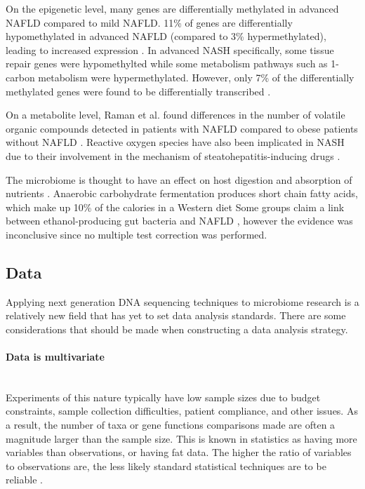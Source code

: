 On the epigenetic level, many genes are differentially methylated in advanced NAFLD compared to mild NAFLD. 11\% of genes are differentially hypomethylated in advanced NAFLD (compared to 3\% hypermethylated), leading to increased expression \cite{murphy2013relationship}. In advanced NASH specifically, some tissue repair genes were hypomethylted while some metabolism pathways such as 1-carbon metabolism were hypermethylated. However, only 7\% of the differentially methylated genes were found to be differentially transcribed \cite{murphy2013relationship}.

On a metabolite level, Raman et al. found differences in the number of volatile organic compounds detected in patients with NAFLD compared to obese patients without NAFLD \cite{raman2013fecal}. Reactive oxygen species have also been implicated in NASH due to their involvement in the mechanism of steatohepatitis-inducing drugs \cite{berson1998steatohepatitis}.

The microbiome is thought to have an effect on host digestion and absorption of nutrients \cite{gill2006metagenomic}. Anaerobic carbohydrate fermentation produces short chain fatty acids, which make up 10\% of the calories in a Western diet \cite{mcneil1984contribution} Some groups claim a link between ethanol-producing gut bacteria and NAFLD \cite{zhu2013characterization} \cite{jiang2015dysbiosis}, however the evidence was inconclusive since no multiple test correction was performed.

\subsection{Data}
Applying next generation DNA sequencing techniques to microbiome research is a relatively new field that has yet to set data analysis standards. There are some considerations that should be made when constructing a data analysis strategy.

\paragraph{Data is multivariate}\mbox{}\\
Experiments of this nature typically have low sample sizes due to budget constraints, sample collection difficulties, patient compliance, and other issues. As a result, the number of taxa or gene functions comparisons made are often a magnitude larger than the sample size. This is known in statistics as having more variables than observations, or having fat data. The higher the ratio of variables to observations are, the less likely standard statistical techniques are to be reliable \cite{osborne2004sample}.

